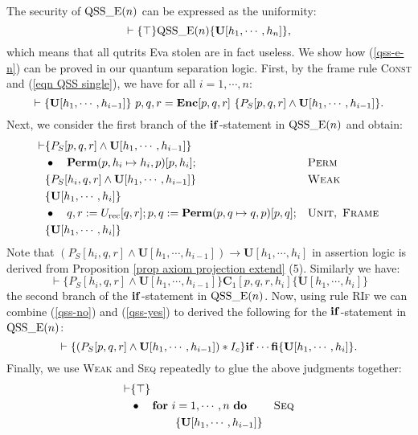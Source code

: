 \documentclass[conference,compsoc, 10pt]{IEEEtran}
\newcommand {\id } {{I}}
\newcommand {\unia } {{\mathbf{U}}}
\newcommand {\prog } {{\mathbf{C}}}
\newcommand {\perm} {\mathbf{Perm}}
\begin{document}
\begin{appendices}
		The security of ${\rm QSS\_ E}(n)$ can be expressed as the uniformity:
		\begin{equation}\vdash\label{qss-e-n}\{\top\}{\rm QSS\_ E}(n)\{\unia[h_1,\cdots,h_n]\},
		\end{equation}
		which means that all qutrits Eva stolen are in fact useless.
		We show how (\ref{qss-e-n}) can be proved in our quantum separation logic. First, by the frame rule \textsc{Const} and (\ref{eqn QSS single}), we have for all $i=1,\cdots,n$:
		$$\vdash\{\unia[h_1,\cdots,h_{i-1}]\}\ p,q,r = {\bf Enc}[p,q,r]\ \{P_S[p,q,r]\wedge\unia[h_1,\cdots,h_{i-1}]\}.$$
		Next, we consider the first branch of the ${\bf if}$-statement in ${\rm QSS\_ E}(n)$ and obtain:
		\begin{align}
		\vdash 
		&\{P_S[p,q,r]\wedge\unia[h_1,\cdots,h_{i-1}]\} && \nonumber\\
		&\bullet\quad \perm(p,h_i\mapsto h_i,p)[p,h_i]; && \textsc{Perm} \nonumber\\
		&\{P_S[h_i,q,r]\wedge\unia[h_1,\cdots,h_{i-1}]\} &&  \textsc{Weak} \nonumber\\
		&\{\unia[h_1,\cdots,h_i]\} && \label{qss-no}\\
		&\bullet\quad q,r := U_{\rm rec}[q,r];p,q := \perm(p,q\mapsto q,p)[p,q]; &&  \textsc{Unit},\ \textsc{Frame} \nonumber\\
		&\{\unia[h_1,\cdots,h_i]\} &&  \nonumber
		\end{align}
		Note that $(P_S[h_i,q,r]\wedge\unia[h_1,\cdots,h_{i-1}])\rightarrow\unia[h_1,\cdots,h_i]$ in assertion logic is derived from Proposition \ref{prop axiom projection extend} (5). 
		Similarly we have: \begin{equation}\label{qss-yes}\vdash\{P_S[h_i,q,r]\wedge\unia[h_1,\cdots,h_{i-1}]\} \prog_1[p,q,r,h_i] \{\unia[h_1,\cdots,h_i]\}\end{equation}
		the second branch of the ${\bf if}$-statement in ${\rm QSS\_ E}(n)$.
		Now, using rule \textsc{RIf} we can combine (\ref{qss-no}) and (\ref{qss-yes}) to derived the following for the ${\bf if}$-statement in ${\rm QSS\_ E}(n)$:
		$$\vdash\{(P_S[p,q,r]\wedge\unia[h_1,\cdots,h_{i-1}])\ast\id_c\}{\bf if}\cdots{\bf fi}\{\unia[h_1,\cdots,h_i]\}.$$
		Finally, we use \textsc{Weak} and \textsc{Seq} repeatedly to glue the above  judgments together:
		\begin{align*}\vdash 
		&\{\top\} &&\\
		&\bullet\quad {\bf for}\ i=1,\cdots, n\ {\bf do} && \textsc{Seq}\\
		&\qquad\qquad \{\unia[h_1,\cdots,h_{i-1}]\} && \\

\end{align*}
\end{appendices}
\end{document}
